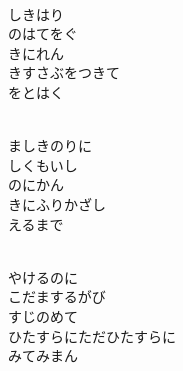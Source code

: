 \documentclass[10pt,b5j]{tarticle} %
\begin{document}
\vspace{1.5em} %
\newcommand{\linespace}{0.5em} %
\newcommand{\blocksize}{0.5\hsize} %
\newcommand{\itemmargin}{3em} %
\begin{enumerate} %
    \setlength{\itemindent}{\itemmargin} %
    \begin{minipage}[c]{\blocksize}
    
        \vspace{\linespace}
        \item~\\
        しきはり\\
        のはてをぐ\\
        きにれん\\
        きすさぶをつきて\\
        をとはく
        
    \end{minipage}
    \begin{minipage}[c]{\blocksize}
        
        \vspace{\linespace}
        \item~\\
        ましきのりに\\
        しくもいし\\
        のにかん\\
        きにふりかざし\\
        えるまで
        
    \end{minipage}
    \begin{minipage}[c]{\blocksize}
        
        \vspace{\linespace}
        \item~\\
        やけるのに\\
        こだまするがび\\
        すじのめて\\
        ひたすらにただひたすらに\\
        みてみまん
        

\end{minipage}
\end{enumerate}
\end{document}
